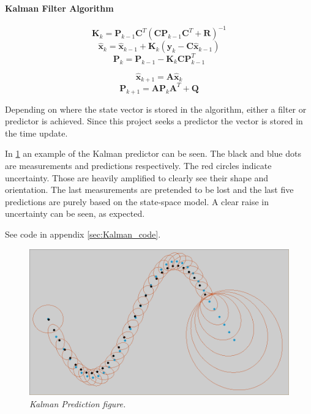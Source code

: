 \paragraph{Kalman Filter Algorithm}	

\begin{equation}
\label{}
\textbf{K}_{k} = \textbf{P}_{k-1}\textbf{C}^T(\textbf{C}\textbf{P}_{k-1}\textbf{C}^T + \textbf{R})^{-1}
\end{equation}
\begin{equation}
\label{}
\hat{\textbf{x}}_k = \hat{\textbf{x}}_{k-1} + \textbf{K}_k (\textbf{y}_k - \textbf{C}\hat{\textbf{x}}_{k-1})
\end{equation}
\begin{equation}
\label{}
\textbf{P}_k = \textbf{P}_{k-1} - \textbf{K}_k\textbf{C}\textbf{P}_{k-1}^T
\end{equation}

\begin{equation}
\label{}
\hat{\textbf{x}}_{k+1} = \textbf{A}\hat{\textbf{x}}_{k}
\end{equation}
\begin{equation}
\label{}
\textbf{P}_{k+1} = \textbf{A}\textbf{P}_{k}\textbf{A}^T + \textbf{Q}
\end{equation}

Depending on where the state vector is stored in the algorithm, either a filter or predictor is achieved. Since this project seeks a predictor the vector is stored in the time update.

In \ref{fig:kalman_fig} an example of the Kalman predictor can be seen. The black and blue dots are measurements and predictions respectively. The red circles indicate uncertainty. Those are heavily amplified to clearly see their shape and orientation. The last measurements are pretended to be lost and the last five predictions are purely based on the state-space model. A clear raise in uncertainty can be seen, as expected. 
 
See code in appendix \ref{sec:Kalman_code}. %

\begin{figure}[htb]
	\centering
	\includegraphics[width=\linewidth]{images/Kalmask2}
	\caption{\textit{Kalman Prediction figure.}}
	\label{fig:kalman_fig} %
\end{figure}